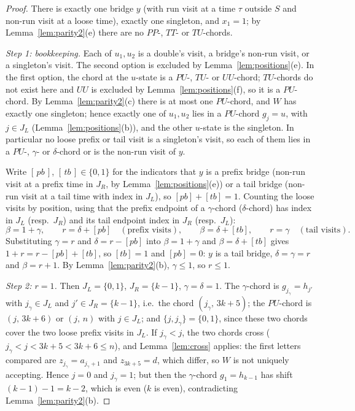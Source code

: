 \documentclass[11pt]{article}
\theoremstyle{definition}
\begin{document}
\begin{proof}
There is exactly one bridge $y$ (with run visit at a time $\tau$ outside
$S$ and non-run visit at a loose time), exactly one singleton, and
$x_1=1$; by Lemma~\ref{lem:parity2}(e) there are no $PP$-, $TT$- or
$TU$-chords.

\emph{Step 1: bookkeeping.} Each of $u_1,u_2$ is a double's visit, a
bridge's non-run visit, or a singleton's visit. The second option is
excluded by Lemma~\ref{lem:positions}(e). In the first option, the chord
at the $u$-state is a $PU$-, $TU$- or $UU$-chord; $TU$-chords do not exist
here and $UU$ is excluded by Lemma~\ref{lem:positions}(f), so it is a
$PU$-chord. By Lemma~\ref{lem:parity2}(c) there is at most one
$PU$-chord, and $W$ has exactly one singleton; hence exactly one of
$u_1,u_2$ lies in a $PU$-chord $g_j=u$, with $j\in J_L$
(Lemma~\ref{lem:positions}(b)), and the other $u$-state is the singleton.
In particular no loose prefix or tail visit is a singleton's visit, so
each of them lies in a $PU$-, $\gamma$- or $\delta$-chord or is the
non-run visit of $y$.

Write $[\,pb\,]$, $[\,tb\,]\in\{0,1\}$ for the indicators that $y$ is a
prefix bridge (non-run visit at a prefix time in $J_R$, by
Lemma~\ref{lem:positions}(e)) or a tail bridge (non-run visit at a tail
time with index in $J_L$), so $[pb]+[tb]=1$. Counting the loose visits by
position, using that the prefix endpoint of a $\gamma$-chord ($\delta$-chord)
has index in $J_L$ (resp.\ $J_R$) and its tail endpoint index in $J_R$
(resp.\ $J_L$):
\[
\beta=1+\gamma,\qquad r=\delta+[pb]\quad(\text{prefix visits}),\qquad
\beta=\delta+[tb],\qquad r=\gamma\quad(\text{tail visits}).
\]
Substituting $\gamma=r$ and $\delta=r-[pb]$ into $\beta=1+\gamma$ and
$\beta=\delta+[tb]$ gives $1+r=r-[pb]+[tb]$, so $[tb]=1$ and $[pb]=0$: $y$
is a tail bridge, $\delta=\gamma=r$ and $\beta=r+1$. By
Lemma~\ref{lem:parity2}(b), $\gamma\le1$, so $r\le1$.

\emph{Step 2: $r=1$.} Then $J_L=\{0,1\}$, $J_R=\{k-1\}$, $\gamma=\delta=1$.
The $\gamma$-chord is $g_{j_\gamma}=h_{j'}$ with $j_\gamma\in J_L$ and
$j'\in J_R=\{k-1\}$, i.e.\ the chord $(j_\gamma,\,3k+5)$; the $PU$-chord
is $(j,\,3k+6)$ or $(j,\,n)$ with $j\in J_L$; and $\{j,j_\gamma\}=\{0,1\}$,
since these two chords cover the two loose prefix visits in $J_L$. If
$j_\gamma<j$, the two chords cross ($j_\gamma<j<3k+5<3k+6\le n$), and
Lemma~\ref{lem:cross} applies: the first letters compared are
$z_{j_\gamma}=a_{j_\gamma+1}$ and $z_{3k+5}=d$, which differ, so $W$ is not
uniquely accepting. Hence $j=0$ and $j_\gamma=1$; but then the
$\gamma$-chord $g_1=h_{k-1}$ has shift $(k-1)-1=k-2$, which is even ($k$
is even), contradicting Lemma~\ref{lem:parity2}(b).


\end{proof}
\end{document}
